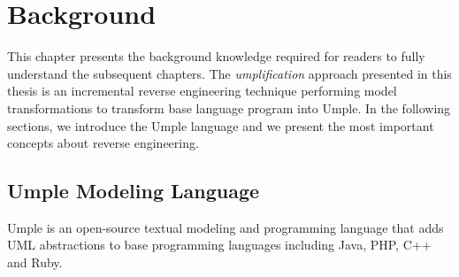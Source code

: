 \lhead{\emph{\leftmark}}  
\chapter{Background}
\label{chap:background}

This chapter presents the background knowledge required for readers to fully understand the subsequent chapters. The \textit{umplification} approach presented in this thesis is an incremental reverse engineering technique performing model transformations to transform base language program into Umple. In the following sections, we introduce the Umple language and we present the most important concepts about reverse engineering. 

\section{Umple Modeling Language}

Umple \cite{UmpleMAIN} is an open-source textual modeling and programming language that adds UML abstractions to base programming languages including Java, PHP, C++ and Ruby.

